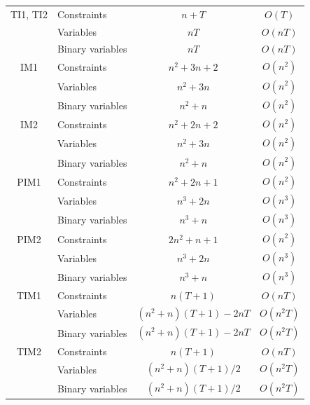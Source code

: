 \documentclass{article}
\begin{document}
\begin{longtable}{c l c c}
%
\pagebreak
%
TI1, TI2 & Constraints & $n + T$ & $O(T)$ \\
& Variables & $nT$ & $O(nT)$ \\
& Binary variables & $nT$ & $O(nT)$ \\
IM1 & Constraints & $n^2 + 3n + 2$ & $O(n^2)$ \\
& Variables & $n^2 + 3n$ & $O(n^2)$ \\
& Binary variables & $n^2 + n$ & $O(n^2)$ \\
IM2 & Constraints & $n^2 + 2n + 2$ & $O(n^2)$ \\
& Variables & $n^2 + 3n$ & $O(n^2)$ \\
& Binary variables & $n^2 + n$ & $O(n^2)$ \\
PIM1 & Constraints & $n^2 + 2n + 1$ & $O(n^2)$ \\
& Variables & $n^3 + 2n$ & $O(n^3)$ \\
& Binary variables & $n^3 + n$ & $O(n^3)$ \\
PIM2 & Constraints & $2n^2 + n + 1$ & $O(n^2)$ \\
& Variables & $n^3 + 2n$ & $O(n^3)$ \\
& Binary variables & $n^3 + n$ & $O(n^3)$ \\
TIM1 & Constraints & $n(T + 1)$ & $O(nT)$ \\
& Variables & $(n^2 + n)(T + 1) - 2nT$ & $O(n^2T)$ \\
& Binary variables & $(n^2 + n)(T + 1) - 2nT$ & $O(n^2T)$ \\
TIM2 & Constraints & $n(T + 1)$ & $O(nT)$ \\
& Variables & $(n^2 + n)(T + 1)/2$ & $O(n^2T)$ \\
& Binary variables & $(n^2 + n)(T + 1)/2$ & $O(n^2T)$ \\
\end{longtable}
\end{document}
